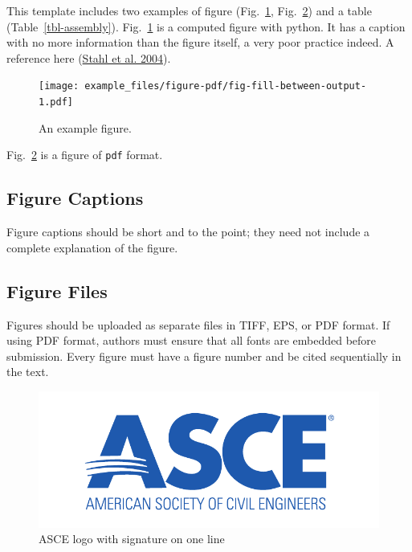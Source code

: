 \documentclass[
  NewProceedings,
  letterpaper]{./assets/ascelike-new}
\begin{document}
This template includes two examples of figure
(Fig.~\ref{fig-fill-between}, Fig.~\ref{fig-asce-logo}) and a table
(Table~\ref{tbl-assembly}). Fig.~\ref{fig-fill-between} is a computed
figure with python. It has a caption with no more information than the
figure itself, a very poor practice indeed. A reference here
(\protect\hyperlink{ref-Stahl:2004a}{Stahl et al. 2004}).

\begin{figure}

{\centering \texttt{[image: example\_files/figure-pdf/fig-fill-between-output-1.pdf]}

}

\caption{\label{fig-fill-between}An example figure.}

\end{figure}

Fig.~\ref{fig-asce-logo} is a figure of \texttt{pdf} format.

\hypertarget{figure-captions}{%
\subsection{Figure Captions}\label{figure-captions}}

Figure captions should be short and to the point; they need not include
a complete explanation of the figure.

\hypertarget{figure-files}{%
\subsection{Figure Files}\label{figure-files}}

Figures should be uploaded as separate files in TIFF, EPS, or PDF
format. If using PDF format, authors must ensure that all fonts are
embedded before submission. Every figure must have a figure number and
be cited sequentially in the text.

\begin{figure}

{\centering 

\includegraphics{./img/asce-logo.pdf}

}

\caption{\label{fig-asce-logo}ASCE logo with signature on one line}

\end{figure}
\end{document}
